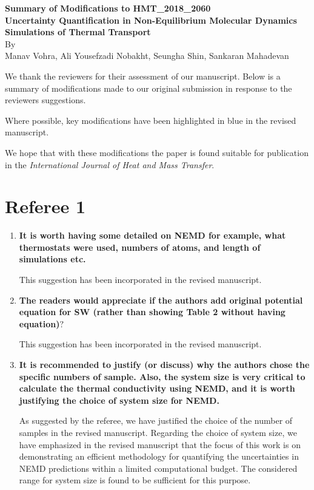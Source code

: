 \documentclass[12pt]{article}
\begin{document}
\parskip=6pt

\begin{center}
{\bf Summary of Modifications to HMT\_2018\_2060}\\[6pt]
{\bf Uncertainty Quantification in Non-Equilibrium Molecular Dynamics Simulations of Thermal Transport}\\[6pt]
By \\
Manav Vohra, Ali Yousefzadi Nobakht, Seungha Shin, Sankaran Mahadevan 
\end{center}

\baselineskip=22pt


\vspace*{1in}

We thank the reviewers for their assessment of our manuscript.
Below is a summary of modifications made to our original submission in
response to the reviewers suggestions.

Where possible, key modifications have been highlighted in blue in the revised
manuscript.

We hope that with these modifications
the paper is found suitable for publication in the {\it International Journal of Heat and Mass Transfer}.

\clearpage

\section*{Referee 1}
\begin{enumerate}[leftmargin=*,itemsep=24pt]
\item \textbf{It is worth having some detailed on NEMD for example, what thermostats were used, 
numbers of atoms, and length of simulations etc.}

This suggestion has been incorporated in the revised manuscript. 

\item \textbf{The readers would appreciate if the authors add original potential equation for SW (rather than
showing Table 2 without having equation)$?$}

This suggestion has been incorporated in the revised manuscript. 

\item \textbf{It is recommended to justify (or discuss) why the authors chose the specific numbers of sample.
Also, the system size is very critical to calculate the thermal conductivity using NEMD, and it is
worth justifying the choice of system size for NEMD.}

As suggested by the referee, we have justified the choice of the number of samples in the revised manuscript.
Regarding the choice of system size, we have emphasized in the revised manuscript that the focus of this
work is on demonstrating an efficient methodology for quantifying the uncertainties in NEMD predictions
within a limited computational budget. The considered range for system size is found to be sufficient for
this purpose. 

\end{enumerate}
\end{document}
